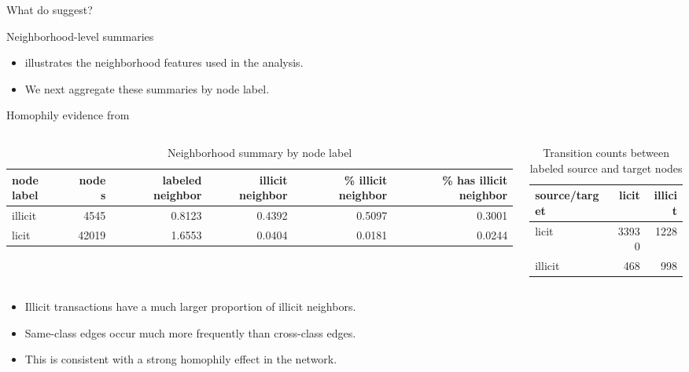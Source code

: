 \documentclass[aspectratio=169]{beamer}
\begin{document}
\begin{frame}{What do  suggest?}
\begin{frame}{Neighborhood-level summaries}
\vspace{-0.25cm}
\begin{itemize}
    \item {} illustrates the neighborhood features used in the analysis.
    \item We next aggregate these summaries by node label.
\end{itemize}
\end{frame}

\begin{frame}{Homophily evidence from }
\small
\begin{columns}[T]
\begin{column}{0.62\textwidth}
\begin{table}
\centering
\caption{Neighborhood summary by node label}
\begin{tabular}{lrrrrr}
\toprule
node label & nodes & labeled neighbor & illicit neighbor & \% illicit neighbor & \% has illicit neighbor \\
\midrule
illicit & 4545  & 0.8123 & 0.4392 & 0.5097 & 0.3001 \\
licit   & 42019 & 1.6553 & 0.0404 & 0.0181 & 0.0244 \\
\bottomrule
\end{tabular}
\label{table:neighbor}
\end{table}
\end{column}
\begin{column}{0.34\textwidth}
\begin{table}
\centering
\caption{Transition counts between labeled source and target nodes}
\begin{tabular}{lrr}
\toprule
source/target & licit & illicit \\
\midrule
licit   & 33930 & 1228 \\
illicit & 468   & 998  \\
\bottomrule
\end{tabular}
\label{table:transition}
\end{table}
\end{column}
\end{columns}

\vspace{-0.1cm}
\begin{itemize}
    \item Illicit transactions have a much larger proportion of illicit neighbors.
    \item Same-class edges occur much more frequently than cross-class edges.
    \item This is consistent with a strong \alert{homophily effect} in the network.
\end{itemize}
\end{frame}


\end{frame}
\end{document}
